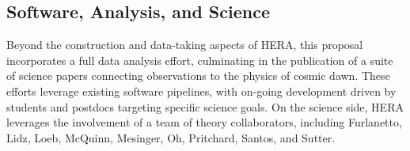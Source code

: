 \documentclass[ars]{copernicus}
\begin{document}
%
%

\subsection{Software, Analysis, and Science}
\label{sec:analysis}

Beyond the construction and data-taking aspects of HERA, this proposal
incorporates a full data analysis effort, culminating in the publication of a
suite of science papers connecting observations to the physics of cosmic dawn.
These efforts leverage existing software pipelines, with on-going 
development driven by students and postdocs targeting specific science goals.
On the science side, HERA leverages the involvement of a team of theory collaborators,
including Furlanetto, Lidz, Loeb, McQuinn, Mesinger, Oh, Pritchard, Santos, and Sutter.

\end{document}
